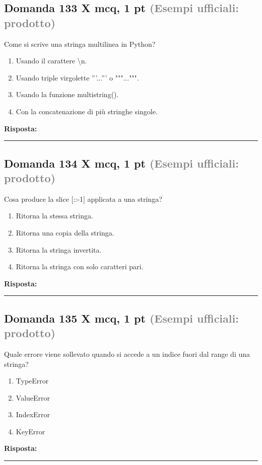 \documentclass[a4paper,11pt]{article}
\begin{document}
\subsection*{Domanda 133 X \hfill {\small mcq, 1 pt \textcolor{gray}{(Esempi ufficiali: prodotto)}}}
Come si scrive una stringa multilinea in Python?

\begin{enumerate}[label=\alph*)]
\item Usando il carattere \textbackslash{}n.
\item Usando triple virgolette '''...''' o """...""".
\item Usando la funzione multistring().
\item Con la concatenazione di più stringhe singole.
\end{enumerate}
\vspace{0.2cm}
\noindent\textbf{Risposta:}\par
\vspace{1.5cm}\hrule


\subsection*{Domanda 134 X \hfill {\small mcq, 1 pt \textcolor{gray}{(Esempi ufficiali: prodotto)}}}
Cosa produce la slice [::-1] applicata a una stringa?

\begin{enumerate}[label=\alph*)]
\item Ritorna la stessa stringa.
\item Ritorna una copia della stringa.
\item Ritorna la stringa invertita.
\item Ritorna la stringa con solo caratteri pari.
\end{enumerate}
\vspace{0.2cm}
\noindent\textbf{Risposta:}\par
\vspace{1.5cm}\hrule


\subsection*{Domanda 135 X \hfill {\small mcq, 1 pt \textcolor{gray}{(Esempi ufficiali: prodotto)}}}
Quale errore viene sollevato quando si accede a un indice fuori dal range di una stringa?

\begin{enumerate}[label=\alph*)]
\item TypeError
\item ValueError
\item IndexError
\item KeyError
\end{enumerate}
\vspace{0.2cm}
\noindent\textbf{Risposta:}\par
\vspace{1.5cm}\hrule
\end{document}
